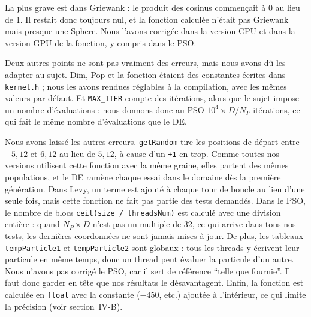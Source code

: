 \documentclass[conference]{IEEEtran}
\begin{document}
La plus grave est dans Griewank : le produit des cosinus commen\c cait \`a 0 au lieu de 1. Il restait donc toujours nul, et la fonction calcul\'ee n'\'etait pas Griewank mais presque une Sphere. Nous l'avons corrig\'ee dans la version CPU et dans la version GPU de la fonction, y compris dans le PSO.

Deux autres points ne sont pas vraiment des erreurs, mais nous avons d\^u les adapter au sujet. Dim, Pop et la fonction \'etaient des constantes \'ecrites dans \texttt{kernel.h} ; nous les avons rendues r\'eglables \`a la compilation, avec les m\^emes valeurs par d\'efaut. Et \texttt{MAX\_ITER} compte des it\'erations, alors que le sujet impose un nombre d'\'evaluations : nous donnons donc au PSO $10^4\times D/N_P$ it\'erations, ce qui fait le m\^eme nombre d'\'evaluations que le DE.

Nous avons laiss\'e les autres erreurs. \texttt{getRandom} tire les positions de d\'epart entre $-5{,}12$ et $6{,}12$ au lieu de $5{,}12$, \`a cause d'un \texttt{+1} en trop. Comme toutes nos versions utilisent cette fonction avec la m\^eme graine, elles partent des m\^emes populations, et le DE ram\`ene chaque essai dans le domaine d\`es la premi\`ere g\'en\'eration. Dans Levy, un terme est ajout\'e \`a chaque tour de boucle au lieu d'une seule fois, mais cette fonction ne fait pas partie des tests demand\'es. Dans le PSO, le nombre de blocs \texttt{ceil(size / threadsNum)} est calcul\'e avec une division enti\`ere : quand $N_P\times D$ n'est pas un multiple de 32, ce qui arrive dans tous nos tests, les derni\`eres coordonn\'ees ne sont jamais mises \`a jour. De plus, les tableaux \texttt{tempParticle1} et \texttt{tempParticle2} sont globaux : tous les threads y \'ecrivent leur particule en m\^eme temps, donc un thread peut \'evaluer la particule d'un autre. Nous n'avons pas corrig\'e le PSO, car il sert de r\'ef\'erence ``telle que fournie''. Il faut donc garder en t\^ete que nos r\'esultats le d\'esavantagent. Enfin, la fonction est calcul\'ee en \texttt{float} avec la constante ($-450$, etc.) ajout\'ee \`a l'int\'erieur, ce qui limite la pr\'ecision (voir section~IV-B).
\end{document}
